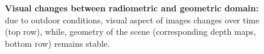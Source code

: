 \begin{figure}
	\caption[Images and depth maps comparison]{\label{fig:image_vs_depth} \textbf{Visual changes between radiometric and geometric domain:} due to outdoor conditions, visual aspect of images changes over time (top row), while, geometry of the scene (corresponding depth maps, bottom row) remains stable.}
	
\end{figure}
	